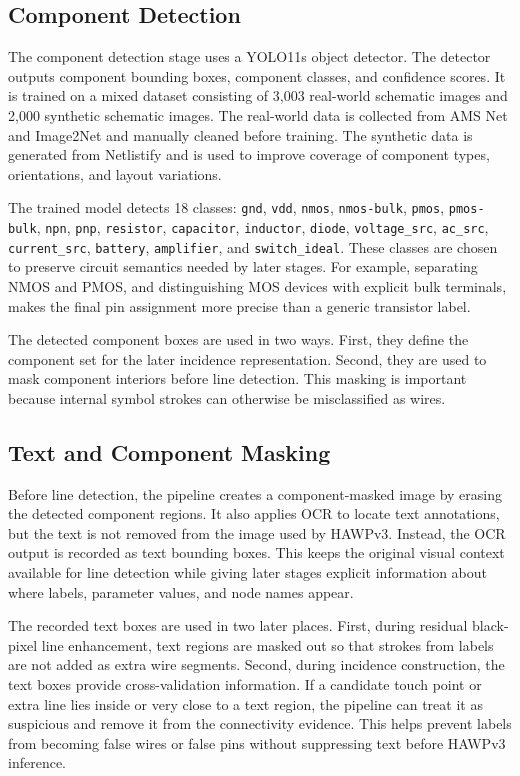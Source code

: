 \subsection{Component Detection}
\label{subsec:component-detection}

The component detection stage uses a YOLO11s object detector. The detector outputs component bounding boxes, component classes, and confidence scores. It is trained on a mixed dataset consisting of 3,003 real-world schematic images and 2,000 synthetic schematic images. The real-world data is collected from AMS Net and Image2Net and manually cleaned before training. The synthetic data is generated from Netlistify and is used to improve coverage of component types, orientations, and layout variations.

The trained model detects 18 classes:
\texttt{gnd}, \texttt{vdd}, \texttt{nmos}, \texttt{nmos-bulk}, \texttt{pmos}, \texttt{pmos-bulk}, \texttt{npn}, \texttt{pnp}, \texttt{resistor}, \texttt{capacitor}, \texttt{inductor}, \texttt{diode}, \texttt{voltage\_src}, \texttt{ac\_src}, \texttt{current\_src}, \texttt{battery}, \texttt{amplifier}, and \texttt{switch\_ideal}. These classes are chosen to preserve circuit semantics needed by later stages. For example, separating NMOS and PMOS, and distinguishing MOS devices with explicit bulk terminals, makes the final pin assignment more precise than a generic transistor label.

The detected component boxes are used in two ways. First, they define the component set for the later incidence representation. Second, they are used to mask component interiors before line detection. This masking is important because internal symbol strokes can otherwise be misclassified as wires.

\subsection{Text and Component Masking}
\label{subsec:masking}

Before line detection, the pipeline creates a component-masked image by erasing the detected component regions. It also applies OCR to locate text annotations, but the text is not removed from the image used by HAWPv3. Instead, the OCR output is recorded as text bounding boxes. This keeps the original visual context available for line detection while giving later stages explicit information about where labels, parameter values, and node names appear.

The recorded text boxes are used in two later places. First, during residual black-pixel line enhancement, text regions are masked out so that strokes from labels are not added as extra wire segments. Second, during incidence construction, the text boxes provide cross-validation information. If a candidate touch point or extra line lies inside or very close to a text region, the pipeline can treat it as suspicious and remove it from the connectivity evidence. This helps prevent labels from becoming false wires or false pins without suppressing text before HAWPv3 inference.

